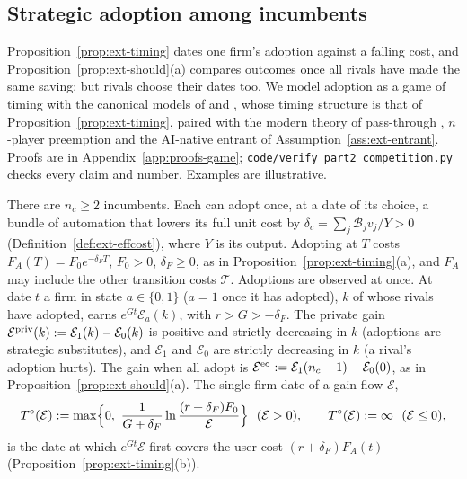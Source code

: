 \subsection{Strategic adoption among incumbents}\label{sec:ext-game}

Proposition~\ref{prop:ext-timing} dates one firm's adoption against a falling cost, and Proposition~\ref{prop:ext-should}(a) compares outcomes once all rivals have made the same saving; but rivals choose their dates too. We model adoption as a game of timing with the canonical models of \citet{reinganum1981diffusion,reinganum1981market} and \citet{fudenberg1985preemption}, whose timing structure is that of Proposition~\ref{prop:ext-timing}, paired with the modern theory of pass-through \citep{weyl2013pass}, $n$-player preemption \citep{argenziano2014clustering} and the AI-native entrant of Assumption~\ref{ass:ext-entrant}. Proofs are in Appendix~\ref{app:proofs-game}; \texttt{code/verify\_part2\_competition.py} checks every claim and number. Examples are illustrative.

\begin{assumption}\label{ass:ext-game}
There are $n_c\ge2$ incumbents. Each can adopt once, at a date of its choice, a bundle of automation that lowers its full unit cost by $\delta_c=\sum_j\mathcal B_jv_j/Y>0$ (Definition~\ref{def:ext-effcost}), where $Y$ is its output. Adopting at $T$ costs $F_A(T)=F_0e^{-\delta_FT}$, $F_0>0$, $\delta_F\ge0$, as in Proposition~\ref{prop:ext-timing}(a), and $F_A$ may include the other transition costs $\mathcal T$. Adoptions are observed at once. At date $t$ a firm in state $a\in\{0,1\}$ ($a=1$ once it has adopted), $k$ of whose rivals have adopted, earns $e^{Gt}\mathcal E_a(k)$, with $r>G>-\delta_F$. The private gain $\mathcal E^{\rm priv}(k):=\mathcal E_1(k)-\mathcal E_0(k)$ is positive and strictly decreasing in $k$ (adoptions are strategic substitutes), and $\mathcal E_1$ and $\mathcal E_0$ are strictly decreasing in $k$ (a rival's adoption hurts). The gain when all adopt is $\mathcal E^{\rm eq}:=\mathcal E_1(n_c-1)-\mathcal E_0(0)$, as in Proposition~\ref{prop:ext-should}(a). The single-firm date of a gain flow $\mathcal E$,
\begin{equation}\label{eq:ext-game-To}
T^\circ(\mathcal E):=\max\Bigl\{0,\ \frac1{G+\delta_F}\ln\frac{(r+\delta_F)F_0}{\mathcal E}\Bigr\}\ \ (\mathcal E>0),\qquad T^\circ(\mathcal E):=\infty\ \ (\mathcal E\le0),
\end{equation}
is the date at which $e^{Gt}\mathcal E$ first covers the user cost $(r+\delta_F)F_A(t)$ (Proposition~\ref{prop:ext-timing}(b)).
\end{assumption}


